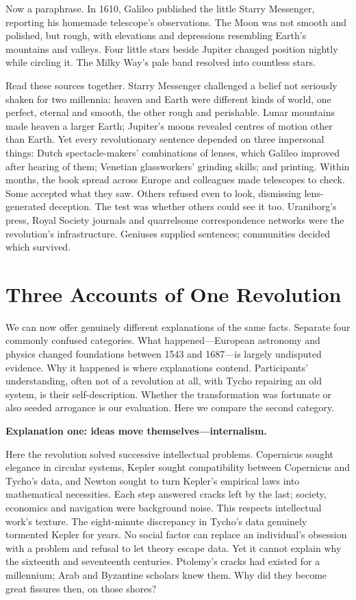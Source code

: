 Now a paraphrase. In 1610, Galileo published the little Starry Messenger, reporting his homemade telescope's observations. The Moon was not smooth and polished, but rough, with elevations and depressions resembling Earth's mountains and valleys. Four little stars beside Jupiter changed position nightly while circling it. The Milky Way's pale band resolved into countless stars.

Read these sources together. Starry Messenger challenged a belief not seriously shaken for two millennia: heaven and Earth were different kinds of world, one perfect, eternal and smooth, the other rough and perishable. Lunar mountains made heaven a larger Earth; Jupiter's moons revealed centres of motion other than Earth. Yet every revolutionary sentence depended on three impersonal things: Dutch spectacle-makers' combinations of lenses, which Galileo improved after hearing of them; Venetian glassworkers' grinding skills; and printing. Within months, the book spread across Europe and colleagues made telescopes to check. Some accepted what they saw. Others refused even to look, dismissing lens-generated deception. The test was whether others could see it too. Uraniborg's press, Royal Society journals and quarrelsome correspondence networks were the revolution's infrastructure. Geniuses supplied sentences; communities decided which survived.

\section{Three Accounts of One Revolution}
We can now offer genuinely different explanations of the same facts. Separate four commonly confused categories. What happened---European astronomy and physics changed foundations between 1543 and 1687---is largely undisputed evidence. Why it happened is where explanations contend. Participants' understanding, often not of a revolution at all, with Tycho repairing an old system, is their self-description. Whether the transformation was fortunate or also seeded arrogance is our evaluation. Here we compare the second category.

\textbf{Explanation one: ideas move themselves---internalism.}

Here the revolution solved successive intellectual problems. Copernicus sought elegance in circular systems, Kepler sought compatibility between Copernicus and Tycho's data, and Newton sought to turn Kepler's empirical laws into mathematical necessities. Each step answered cracks left by the last; society, economics and navigation were background noise. This respects intellectual work's texture. The eight-minute discrepancy in Tycho's data genuinely tormented Kepler for years. No social factor can replace an individual's obsession with a problem and refusal to let theory escape data. Yet it cannot explain why the sixteenth and seventeenth centuries. Ptolemy's cracks had existed for a millennium; Arab and Byzantine scholars knew them. Why did they become great fissures then, on those shores?

